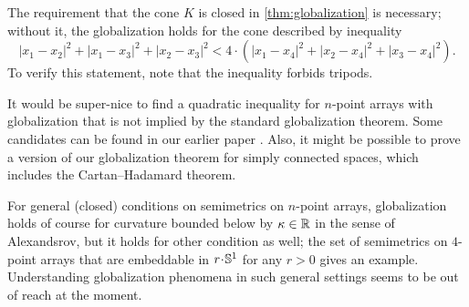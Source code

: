 \documentclass[a4paper,10pt]{article}
\begin{document}
The requirement that the cone $K$ is closed in \ref{thm:globalization} is necessary;
without it, the globalization holds for the cone described by inequality
\[|x_1-x_2|^2+|x_1-x_3|^2+|x_2-x_3|^2<4\cdot(|x_1-x_4|^2+|x_2-x_4|^2+|x_3-x_4|^2).\]
To verify this statement, note that the inequality forbids tripods.

It would be super-nice to find a quadratic inequality for $n$-point arrays with globalization that is not implied by the standard globalization theorem.
Some candidates can be found in our earlier paper \cite{lebedeva-petrunin-zolotov}.
Also, it might be possible to prove a version of our globalization theorem
for simply connected spaces, which includes the Cartan--Hadamard theorem.

For general (closed) conditions on semimetrics on $n$-point arrays, globalization holds of course for curvature bounded below by $\kappa\in \mathbb{R}$ in the sense of Alexandsrov,
but it holds for other condition as well;
the set of semimetrics on $4$-point arrays that are embeddable in $r\cdot\SSS^1$ for any $r>0$ gives an example.
Understanding globalization phenomena in such general settings seems to be out of reach at the moment.

{\sloppy
\def\emph{\textit}
\printbibliography[heading=bibintoc]
\fussy
}
\end{document}
